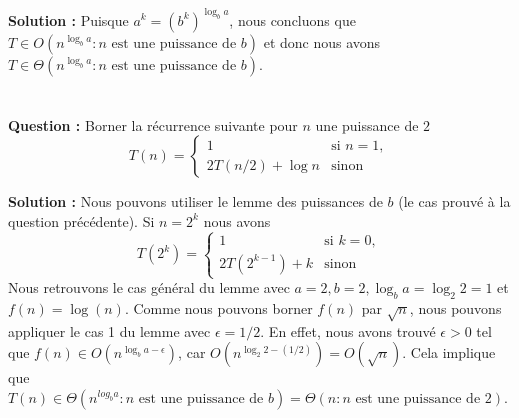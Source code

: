 \documentclass[11pt]{article} %
\newenvironment{question}[1][\unskip]{%
	\par
	\noindent
	\textbf{Question #1:}
	\noindent}
{\medskip}
\newenvironment{solution}[1][\unskip]{%
	\par
	\noindent
	\textbf{Solution #1:}
	\noindent}
{\medskip}
\begin{document}
\begin{solution}
		Puisque $a^k=(b^k)^{\log_ba}$, nous concluons que $T \in O(n^{\log_ba}: n\text{ est une puissance de }b)$ et donc nous avons  $T \in \Theta(n^{\log_b a} : n\text{ est une puissance de }b)$.
	\end{solution}
\section{}

\begin{question}
	Borner la récurrence suivante pour $n$ une puissance de $2$
	\begin{equation*}
	T(n)=\left\{
	\begin{array}{ll}
	1 & \text{si } n=1,\\
	2T(n/2)+\log n & \text{sinon }
	\end{array} \right.
	\end{equation*}	
\end{question}

\begin{solution}
	Nous pouvons utiliser le lemme des puissances de $b$ (le cas prouvé à la question précédente). Si $n=2^k$ nous avons
	\begin{equation*}
	T(2^k)=\left\{
	\begin{array}{ll}
	1 & \text{si } k=0,\\
	2T(2^{k-1})+k & \text{sinon }
	\end{array} \right.
	\end{equation*}
	Nous retrouvons le cas général du lemme avec $a=2, b=2, \log_b a=\log_2 2 = 1$ et $f(n) = \log (n)$. Comme nous pouvons borner $f(n)$ par $\sqrt{n}$, nous pouvons appliquer le cas 1 du lemme avec $\epsilon = 1/2$. En effet, nous avons trouvé $\epsilon > 0$ tel que $f(n) \in O(n^{\log_b a-\epsilon})$, car $O(n^{\log_2 2-(1/2)})=O(\sqrt{n})$. Cela implique que $T(n) \in \Theta(n^{log_b a}: n \text{ est une puissance de }b)=\Theta(n: n \text{ est une puissance de }2)$.
\end{solution}	

\section{}
	
\end{document}
